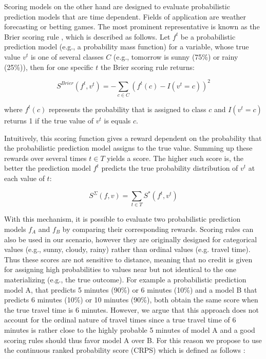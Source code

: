 Scoring models on the other hand are designed to evaluate probabilistic prediction models that are time dependent. Fields of application are weather forecasting or betting games. The most prominent representative is known as the Brier scoring rule \cite{Brier50}, which is described as follows. Let $f^t$ be a probabilistic prediction model (e.g., a probability mass function) for a variable, whose true value $v^t$ is one of several classes $C$ (e.g., tomorrow is sunny (75\%) or rainy (25\%)), then for one specific $t$ the Brier scoring rule returns:

$$
	S^{Brier}(f^t, v^t) = -\sum_{c \in C} (f^t(c) - I(v^t = c))^2
$$

where $f^t(c)$ represents the probability that is assigned to class $c$ and $I(v^t = c)$ returns 1 if the true value of $v^t$ is equals $c$.

Intuitively, this scoring function gives a reward dependent on the probability that the probabilistic prediction model assigns to the true value. Summing up these rewards over several times $t \in T$ yields a score. The higher such score is, the better the prediction model $f^t$ predicts the true probability distribution of $v^t$ at each value of $t$:

$$
	S^\Sigma (f, v) = \sum_{t \in T} S^*(f^t, v^t)
$$

With this mechanism, it is possible to evaluate two probabilistic prediction models $f_A$ and $f_B$ by comparing their corresponding rewards. Scoring rules can also be used in our scenario, however they are originally designed for categorical values (e.g., sunny, cloudy, rainy) rather than ordinal values (e.g. travel time). Thus these scores are not sensitive to distance, meaning that no credit is given for assigning high probabilities to values near but not identical to the one materializing (e.g., the true outcome). For example a probabilistic prediction model A, that predicts 5 minutes (90\%) or 6 minutes (10\%) and a model B that predicts 6 minutes (10\%) or 10 minutes (90\%), both obtain the same score when the true travel time is 6 minutes. However, we argue that this approach does not account for the ordinal nature of travel times since a true travel time of 6 minutes is rather close to the highly probable 5 minutes of model A and a good scoring rules should thus favor model A over B. For this reason we propose to use the continuous ranked probability score (CRPS) which is defined as follows \cite{Hersbach00}:

\vspace{0.1cm}

